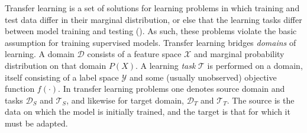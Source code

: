 Transfer learning is a set of solutions for learning problems in which training and test data differ in their marginal distribution, or else that the learning tasks differ between model training and testing (\cite{pan2009survey}). As such, these problems violate the basic assumption for training supervised models. Transfer learning bridges \emph{domains} of learning. A domain $\mathcal{D}$ consists of a feature space $\mathcal{X}$ and marginal probability distribution on that domain $P(X)$. A learning \emph{task} $\mathcal{T}$ is performed on a domain, itself consisting of a label space $\mathcal{Y}$ and some (usually unobserved) objective function $f(\cdot)$. In transfer learning problems one denotes source domain and tasks $\mathcal{D}_S$ and $\mathcal{T}_S$, and likewise for target domain, $\mathcal{D}_T$ and $\mathcal{T}_T$. The source is the data on which the model is initially trained, and the target is that for which it must be adapted.

